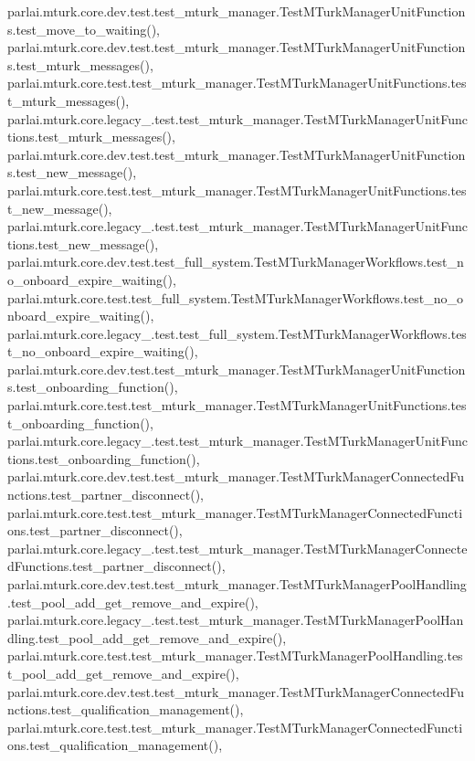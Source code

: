parlai.\+mturk.\+core.\+dev.\+test.\+test\+\_\+mturk\+\_\+manager.\+Test\+M\+Turk\+Manager\+Unit\+Functions.\+test\+\_\+move\+\_\+to\+\_\+waiting(), parlai.\+mturk.\+core.\+dev.\+test.\+test\+\_\+mturk\+\_\+manager.\+Test\+M\+Turk\+Manager\+Unit\+Functions.\+test\+\_\+mturk\+\_\+messages(), parlai.\+mturk.\+core.\+test.\+test\+\_\+mturk\+\_\+manager.\+Test\+M\+Turk\+Manager\+Unit\+Functions.\+test\+\_\+mturk\+\_\+messages(), parlai.\+mturk.\+core.\+legacy\+\_.\+test.\+test\+\_\+mturk\+\_\+manager.\+Test\+M\+Turk\+Manager\+Unit\+Functions.\+test\+\_\+mturk\+\_\+messages(), parlai.\+mturk.\+core.\+dev.\+test.\+test\+\_\+mturk\+\_\+manager.\+Test\+M\+Turk\+Manager\+Unit\+Functions.\+test\+\_\+new\+\_\+message(), parlai.\+mturk.\+core.\+test.\+test\+\_\+mturk\+\_\+manager.\+Test\+M\+Turk\+Manager\+Unit\+Functions.\+test\+\_\+new\+\_\+message(), parlai.\+mturk.\+core.\+legacy\+\_.\+test.\+test\+\_\+mturk\+\_\+manager.\+Test\+M\+Turk\+Manager\+Unit\+Functions.\+test\+\_\+new\+\_\+message(), parlai.\+mturk.\+core.\+dev.\+test.\+test\+\_\+full\+\_\+system.\+Test\+M\+Turk\+Manager\+Workflows.\+test\+\_\+no\+\_\+onboard\+\_\+expire\+\_\+waiting(), parlai.\+mturk.\+core.\+test.\+test\+\_\+full\+\_\+system.\+Test\+M\+Turk\+Manager\+Workflows.\+test\+\_\+no\+\_\+onboard\+\_\+expire\+\_\+waiting(), parlai.\+mturk.\+core.\+legacy\+\_.\+test.\+test\+\_\+full\+\_\+system.\+Test\+M\+Turk\+Manager\+Workflows.\+test\+\_\+no\+\_\+onboard\+\_\+expire\+\_\+waiting(), parlai.\+mturk.\+core.\+dev.\+test.\+test\+\_\+mturk\+\_\+manager.\+Test\+M\+Turk\+Manager\+Unit\+Functions.\+test\+\_\+onboarding\+\_\+function(), parlai.\+mturk.\+core.\+test.\+test\+\_\+mturk\+\_\+manager.\+Test\+M\+Turk\+Manager\+Unit\+Functions.\+test\+\_\+onboarding\+\_\+function(), parlai.\+mturk.\+core.\+legacy\+\_.\+test.\+test\+\_\+mturk\+\_\+manager.\+Test\+M\+Turk\+Manager\+Unit\+Functions.\+test\+\_\+onboarding\+\_\+function(), parlai.\+mturk.\+core.\+dev.\+test.\+test\+\_\+mturk\+\_\+manager.\+Test\+M\+Turk\+Manager\+Connected\+Functions.\+test\+\_\+partner\+\_\+disconnect(), parlai.\+mturk.\+core.\+test.\+test\+\_\+mturk\+\_\+manager.\+Test\+M\+Turk\+Manager\+Connected\+Functions.\+test\+\_\+partner\+\_\+disconnect(), parlai.\+mturk.\+core.\+legacy\+\_.\+test.\+test\+\_\+mturk\+\_\+manager.\+Test\+M\+Turk\+Manager\+Connected\+Functions.\+test\+\_\+partner\+\_\+disconnect(), parlai.\+mturk.\+core.\+dev.\+test.\+test\+\_\+mturk\+\_\+manager.\+Test\+M\+Turk\+Manager\+Pool\+Handling.\+test\+\_\+pool\+\_\+add\+\_\+get\+\_\+remove\+\_\+and\+\_\+expire(), parlai.\+mturk.\+core.\+legacy\+\_.\+test.\+test\+\_\+mturk\+\_\+manager.\+Test\+M\+Turk\+Manager\+Pool\+Handling.\+test\+\_\+pool\+\_\+add\+\_\+get\+\_\+remove\+\_\+and\+\_\+expire(), parlai.\+mturk.\+core.\+test.\+test\+\_\+mturk\+\_\+manager.\+Test\+M\+Turk\+Manager\+Pool\+Handling.\+test\+\_\+pool\+\_\+add\+\_\+get\+\_\+remove\+\_\+and\+\_\+expire(), parlai.\+mturk.\+core.\+dev.\+test.\+test\+\_\+mturk\+\_\+manager.\+Test\+M\+Turk\+Manager\+Connected\+Functions.\+test\+\_\+qualification\+\_\+management(), parlai.\+mturk.\+core.\+test.\+test\+\_\+mturk\+\_\+manager.\+Test\+M\+Turk\+Manager\+Connected\+Functions.\+test\+\_\+qualification\+\_\+management(), 